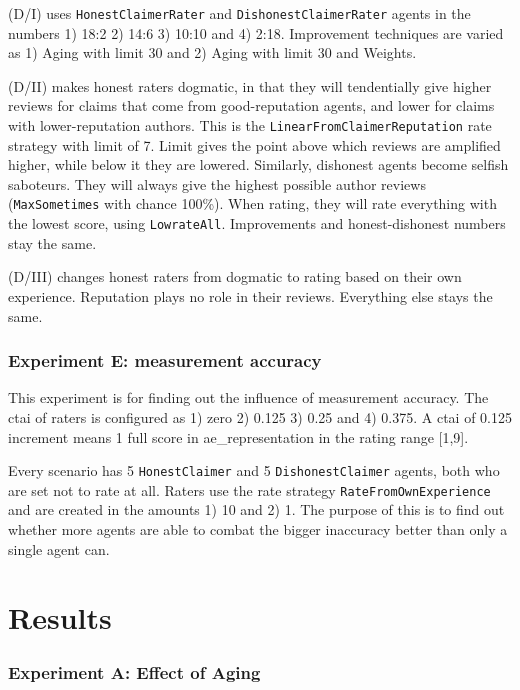 \documentclass[%
    ]{\PathToTumTemplate/thesis/tum_thesis}
\begin{document}
(D/I) uses \texttt{HonestClaimerRater} and \texttt{DishonestClaimerRater} agents in the numbers 1) 18:2 2) 14:6 3) 10:10 and 4) 2:18. Improvement techniques are varied as 1) Aging with limit 30 and 2) Aging with limit 30 and Weights.

(D/II) makes honest raters dogmatic, in that they will tendentially give higher reviews for claims that come from good-reputation agents, and lower for claims with lower-reputation authors. 
This is the \texttt{LinearFromClaimerReputation} rate strategy with limit of 7. 
Limit gives the point above which reviews are amplified higher, while below it they are lowered.
Similarly, dishonest agents become selfish saboteurs. 
They will always give the highest possible author reviews (\texttt{MaxSometimes} with chance 100\%).
When rating, they will rate everything with the lowest score, using \texttt{LowrateAll}.
Improvements and honest-dishonest numbers stay the same.

(D/III) changes honest raters from dogmatic to rating based on their own experience.
Reputation plays no role in their reviews. 
Everything else stays the same.

\subsubsection{Experiment E: measurement accuracy}
This experiment is for finding out the influence of measurement accuracy.
The \gls{ctai} of raters is configured as 1) zero 2) 0.125 3) 0.25 and 4) 0.375.
A \gls{ctai} of 0.125 increment means 1 full score in \gls{ae_representation} in the rating range [1,9].

Every scenario has 5 \texttt{HonestClaimer} and 5 \texttt{DishonestClaimer} agents, both who are set not to rate at all.
Raters use the rate strategy \texttt{RateFromOwnExperience} and are created in the amounts 1) 10 and 2) 1.
The purpose of this is to find out whether more agents are able to combat the bigger inaccuracy better than only a single agent can.



\section{Results}\label{sec:results}

\subsubsection{Experiment A: Effect of Aging}
\end{document}
